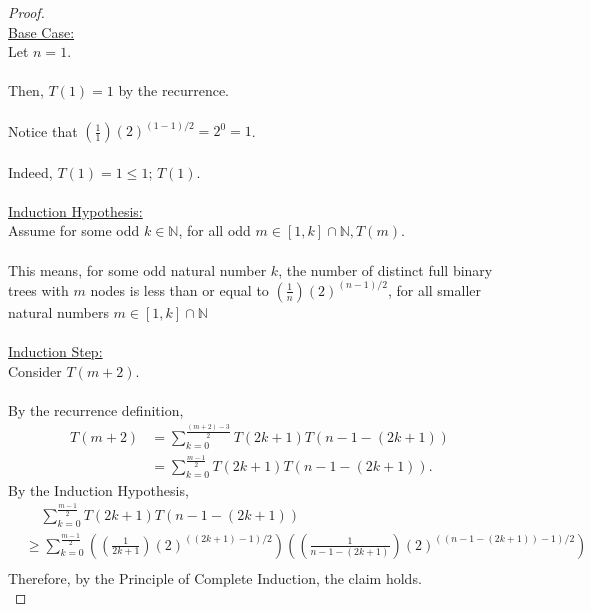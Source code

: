 \documentclass[12pt]{article}
\begin{document}
\begin{proof}
\leavevmode\\
    \underline{Base Case:} \\
    Let $n = 1$. \\
    \\
    Then, $T(1) = 1$ by the recurrence. \\
    \\
    Notice that $(\frac{1}{1})(2)^{(1 - 1) / 2} = 2^0 = 1$. \\
    \\
    Indeed, $T(1) = 1 \leq 1$; $T(1)$. \\
    \\
    \underline{Induction Hypothesis:} \\
    Assume for some odd $k \in \mathbb{N}$, for all odd $m \in [1, k] \cap \mathbb{N}, T(m)$. \\
    \\
    This means, for some odd natural number $k$, the number of distinct full binary trees with $m$ nodes is less than or equal to $(\frac{1}{n})(2)^{(n - 1) / 2}$, for all smaller natural numbers $m \in [1, k] \cap \mathbb{N}$ \\
    \\
    \underline{Induction Step:} \\
    Consider $T(m + 2)$. \\
    \\
    By the recurrence definition,
    \large
    \begin{equation*}
        \begin{aligned}
            T(m + 2) &= \sum_{k = 0}^{\frac{(m + 2) - 3}{2}} T(2k + 1)T(n - 1 - (2k + 1)) \\
            &= \sum_{k = 0}^{\frac{m - 1}{2}} T(2k + 1)T(n - 1 - (2k + 1)) \text{.}
        \end{aligned}
    \end{equation*}
    \normalsize
    By the Induction Hypothesis,
    \large
    \begin{equation*}
        \begin{aligned}
            &\;\;\;\; \sum_{k = 0}^{\frac{m - 1}{2}} T(2k + 1)T(n - 1 - (2k + 1)) \\
            &\geq \sum_{k = 0}^{\frac{m - 1}{2}} ((\frac{1}{2k + 1})(2)^{((2k + 1) - 1) / 2})((\frac{1}{n - 1 - (2k + 1)})(2)^{((n - 1 - (2k + 1)) - 1) / 2}) \\
        \end{aligned}
    \end{equation*}
    \normalsize
    Therefore, by the Principle of Complete Induction, the claim holds. \\
\end{proof}
\end{document}
